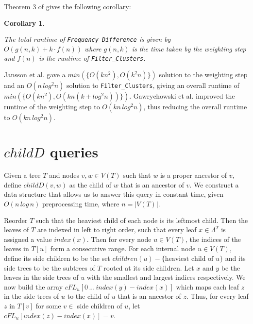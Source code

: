 \documentclass{article}
\newcommand{\leafset}{\Lambda}
\newtheorem{freqdiffruntimecomponents}[incompatibility]{Corollary}
\begin{document}
    Theorem 3 of \cite{jansson2018algorithms} gives the following corollary:
    \newline

    \begin{freqdiffruntimecomponents}
        \label{cor:freqdiffruntimecomponents}

        The total runtime of \texttt{Frequency\_Difference} is given by $O(g(n, k) + k \cdot f(n))$ where $g(n, k)$ is the time taken by the weighting step and $f(n)$ is the runtime of \texttt{Filter\_Clusters}.
    \end{freqdiffruntimecomponents}

    Jansson et al. \cite{jansson2018algorithms} gave a $min(\{O(kn^2), O(k^2n)\})$ solution to the weighting step and an $O(n\,log^2n)$ solution to \texttt{Filter\_Clusters}, giving an overall runtime of $min(\{O(kn^2), O(kn(k + log^2n))\})$. Gawrychowski et al. \cite{gawrychowski2017faster} improved the runtime of the weighting step to $O(kn\,log^2n)$, thus reducing the overall runtime to $O(kn\,log^2n)$.

    \section{$childD$ queries}
    \label{sec:cfd}

    Given a tree $T$ and nodes $v, w \in V(T)$ such that $w$ is a proper ancestor of $v$, define $childD(v, w)$ as the child of $w$ that is an ancestor of $v$. We construct a data structure that allows us to answer this query in constant time, given $O(n\,log\,n)$ preprocessing time, where $n = |V(T)|$.

    Reorder $T$ such that the heaviest child of each node is its leftmost child. Then the leaves of $T$ are indexed in left to right order, such that every leaf $x \in \leafset^T$ is assigned a value $index(x)$. Then for every node $u \in V(T)$, the indices of the leaves in $T[u]$ form a consecutive range. For each internal node $u \in V(T)$, define its side children to be the set $children(u) - \{\text{heaviest child of }u\}$ and its side trees to be the subtrees of $T$ rooted at its side children. Let $x$ and $y$ be the leaves in the side trees of $u$ with the smallest and largest indices respectively. We now build the array $cFL_u[0\, ...\, index(y) - index(x)]$ which maps each leaf $z$ in the side trees of $u$ to the child of $u$ that is an ancestor of $z$. Thus, for every leaf $z$ in $T[v]$ for some $v \in$ side children of $u$, let $cFL_u[index(z) - index(x)] = v$.
    \newline
\end{document}
